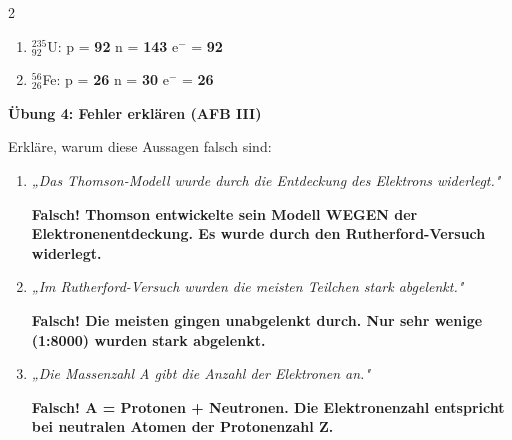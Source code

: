 \documentclass[10pt, a4paper]{article}
\newcommand{\fachfarbe}{physik}
\newcommand{\lsg}[1]{\textcolor{loesung}{\textbf{#1}}}
\newcommand{\abschnitt}[1]{%
    \vspace{8pt}
    \noindent\textbf{\textcolor{\fachfarbe}{#1}}
    \vspace{4pt}
}
\begin{document}
\begin{multicols}{2}
\begin{enumerate}[leftmargin=2em]
\vspace{2pt}

\item $^{235}_{92}$U: \quad p = \lsg{92} \quad n = \lsg{143} \quad e$^-$ = \lsg{92}

\vspace{2pt}

\item $^{56}_{26}$Fe: \quad p = \lsg{26} \quad n = \lsg{30} \quad e$^-$ = \lsg{26}
\end{enumerate}

\vspace{8pt}


\abschnitt{Übung 4: Fehler erklären (AFB III)}

\begin{fehlerbox}
Erkläre, warum diese Aussagen falsch sind:

\vspace{6pt}

\begin{enumerate}[leftmargin=1.5em]
\item \textit{„Das Thomson-Modell wurde durch die Entdeckung des Elektrons widerlegt."}

\vspace{2pt}
\lsg{Falsch! Thomson entwickelte sein Modell WEGEN der Elektronenentdeckung. Es wurde durch den Rutherford-Versuch widerlegt.}

\vspace{6pt}

\item \textit{„Im Rutherford-Versuch wurden die meisten Teilchen stark abgelenkt."}

\vspace{2pt}
\lsg{Falsch! Die meisten gingen unabgelenkt durch. Nur sehr wenige (1:8000) wurden stark abgelenkt.}

\vspace{6pt}

\item \textit{„Die Massenzahl A gibt die Anzahl der Elektronen an."}

\vspace{2pt}
\lsg{Falsch! A = Protonen + Neutronen. Die Elektronenzahl entspricht bei neutralen Atomen der Protonenzahl Z.}
\end{enumerate}
\end{fehlerbox}


\end{multicols}
\end{document}
